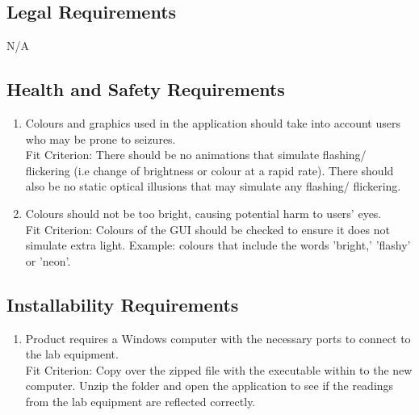\documentclass[12pt, titlepage]{article}
\begin{document}
\subsection{Legal Requirements}
\begin{adjustwidth}{2.7em}{0pt}
\begin{enumerate}[{NFR-LR}1.]
    N/A
\end{enumerate}
\end{adjustwidth}

\subsection{Health and Safety Requirements}
\begin{adjustwidth}{2.2em}{0pt}
\begin{enumerate}[{NFR-H}1.]
  \item Colours and graphics used in the application should take into account users who may be prone to seizures. \\ \label{NFR-H1}
    Fit Criterion: There should be no animations that simulate flashing/ flickering (i.e change of brightness or colour at a rapid rate). There should also be no static optical illusions that may simulate any flashing/ flickering.
    \item Colours should not be too bright, causing potential harm to users' eyes. \\ \label{NFR-H2}
    Fit Criterion: Colours of the GUI should be checked to ensure it does not simulate extra light. Example: colours that include the words 'bright,' 'flashy' or 'neon'.
\end{enumerate}
\end{adjustwidth}

\subsection{Installability Requirements}
\begin{adjustwidth}{2.0em}{0pt}
\begin{enumerate}[{NFR-I}1.]
  \item Product requires a Windows computer with the necessary ports to connect to the lab equipment. \\ \label{NFR-I1}
    Fit Criterion: Copy over the zipped file with the executable within to the new computer. Unzip the folder and open the application to see if the readings from the lab equipment are reflected correctly.
\end{enumerate}
\end{adjustwidth}
\end{document}
